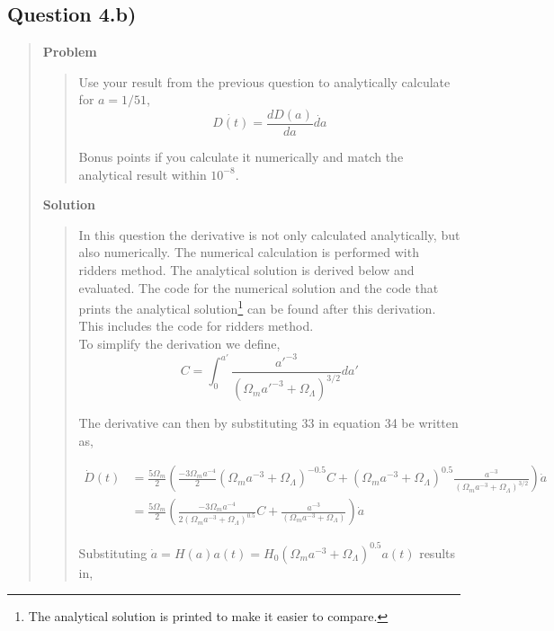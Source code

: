 \newpage
\subsection*{\textbf{Question 4.b)}}
\begin{quote}

\textbf{Problem}
\begin{quote} 
Use your result from the previous question to analytically calculate for $a = 1/51$,
\begin{equation}
\dot{D(t)} = \frac{dD(a)}{da}\dot{da}
\label{EQ:weird}
\end{equation}

Bonus points if you calculate it numerically and match the analytical result within $10^{-8}$. 
\end{quote}

\textbf{Solution} 
\begin{quote}
In this question the derivative is not only calculated analytically, but also numerically. The numerical calculation is performed with ridders method. The analytical solution is derived below and evaluated. The code for the numerical solution and the code that prints the analytical solution\footnote{The analytical solution is printed to make it easier to compare.} can be found after this derivation. This includes the code for ridders method.
\\

To simplify the derivation we define,
\begin{equation}
C = \int_{0}^{a'} \frac{a'^{-3}}{\left( \Omega_m a'^{-3} + \Omega_{\Lambda} \right)^{3/2}} da'
\end{equation}

The derivative can then by substituting 33 in equation 34 be written as,

\begin{align}
\dot{D}(t) &= \frac{5 \Omega_m}{2} \left( \frac{-3 \Omega_m a^{-4}}{2} \left(\Omega_m a^{-3} + \Omega_{\Lambda} \right)^{-0.5}C + \left(\Omega_m a^{-3} + \Omega_{\Lambda} \right)^{0.5} \frac{a^{-3}}{\left( \Omega_m a^{-3} + \Omega_{\Lambda} \right)^{3/2} }  \right) \dot{a} \\
&= \frac{5 \Omega_m}{2} \left( \frac{-3 \Omega_m a^{-4}}{2 \left(\Omega_m a^{-3} + \Omega_{\Lambda} \right)^{0.5}}C + \frac{a^{-3}}{\left( \Omega_m a^{-3} + \Omega_{\Lambda} \right)} \right) \dot{a}
\end{align}

Substituting $\dot{a} = H(a)a(t) = H_0 \left(\Omega_m a^{-3}  + \Omega_{\Lambda} \right)^{0.5}a(t)$ results in,


\end{quote}
\end{quote}
